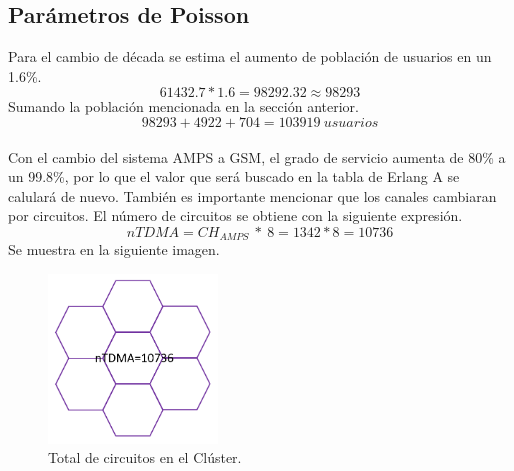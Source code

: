 \documentclass[11pt,letterpaper]{article}
\begin{document}
\subsection{Parámetros de Poisson}
Para el cambio de década se estima el aumento de población de usuarios en un 1.6\%.
\begin{equation}
    61432.7*1.6=98292.32\approx 98293
\end{equation}
Sumando la población mencionada en la sección anterior.
\begin{equation}
    98293 + 4922 + 704 = 103919 \ usuarios
\end{equation}
\\
Con el cambio del sistema AMPS a GSM, el grado de servicio aumenta de 80\% a un 99.8\%, por 
lo que el valor que será buscado en la tabla de Erlang A se calulará de nuevo. También es 
importante mencionar que los canales cambiaran por circuitos. El número de circuitos se 
obtiene con la siguiente expresión. 
\begin{equation}
    nTDMA=CH_{AMPS} \ * \ 8=1342*8=10736
\end{equation}
Se muestra en la siguiente imagen.
\begin{figure}[ht]
    \centering
    \includegraphics[width=0.4\textwidth]{imagenes/t32.png}
    \caption{Total de circuitos en el Clúster.}
\end{figure}

\newpage
\end{document}
